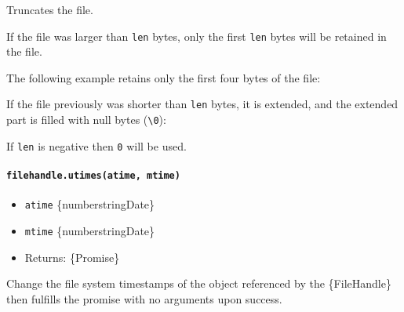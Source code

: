 Truncates the file.

If the file was larger than \texttt{len} bytes, only the first
\texttt{len} bytes will be retained in the file.

The following example retains only the first four bytes of the file:

\begin{Shaded}
\begin{Highlighting}[]
 \OperatorTok{;}

\OperatorTok{=} \OperatorTok{;}
\NormalTok{ \{}
\OperatorTok{=}  \NormalTok{(}\OperatorTok{,} \NormalTok{)}\OperatorTok{;}
  \NormalTok{(}\NormalTok{)}\OperatorTok{;}
\NormalTok{\} }\NormalTok{ \{}
  \NormalTok{()}\OperatorTok{;}
\NormalTok{\}}
\end{Highlighting}
\end{Shaded}

If the file previously was shorter than \texttt{len} bytes, it is
extended, and the extended part is filled with null bytes
(\texttt{\textquotesingle{}\textbackslash{}0\textquotesingle{}}):

If \texttt{len} is negative then \texttt{0} will be used.

\paragraph{\texorpdfstring{\texttt{filehandle.utimes(atime,\ mtime)}}{filehandle.utimes(atime, mtime)}}\label{filehandle.utimesatime-mtime}

\begin{itemize}
\tightlist
\item
  \texttt{atime} \{number\textbar string\textbar Date\}
\item
  \texttt{mtime} \{number\textbar string\textbar Date\}
\item
  Returns: \{Promise\}
\end{itemize}

Change the file system timestamps of the object referenced by the
\{FileHandle\} then fulfills the promise with no arguments upon success.

